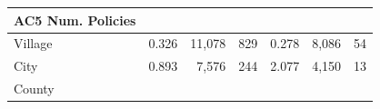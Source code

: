 \documentclass[]{book}
\theoremstyle{definition}
\theoremstyle{definition}
\theoremstyle{definition}
\theoremstyle{remark}
\begin{document}
\begin{longtable}[]{@{}lrrrrrr@{}}
\begin{minipage}[b]{0.11\columnwidth}
AC5 Num. Policies\strut
\end{minipage}\tabularnewline
\midrule
\endhead
\begin{minipage}[t]{0.10\columnwidth}\raggedright\strut
Village\strut
\end{minipage} & \begin{minipage}[t]{0.12\columnwidth}\raggedleft\strut
0.326\strut
\end{minipage} & \begin{minipage}[t]{0.11\columnwidth}\raggedleft\strut
11,078\strut
\end{minipage} & \begin{minipage}[t]{0.11\columnwidth}\raggedleft\strut
829\strut
\end{minipage} & \begin{minipage}[t]{0.12\columnwidth}\raggedleft\strut
0.278\strut
\end{minipage} & \begin{minipage}[t]{0.11\columnwidth}\raggedleft\strut
8,086\strut
\end{minipage} & \begin{minipage}[t]{0.11\columnwidth}\raggedleft\strut
54\strut
\end{minipage}\tabularnewline
\begin{minipage}[t]{0.10\columnwidth}\raggedright\strut
City\strut
\end{minipage} & \begin{minipage}[t]{0.12\columnwidth}\raggedleft\strut
0.893\strut
\end{minipage} & \begin{minipage}[t]{0.11\columnwidth}\raggedleft\strut
7,576\strut
\end{minipage} & \begin{minipage}[t]{0.11\columnwidth}\raggedleft\strut
244\strut
\end{minipage} & \begin{minipage}[t]{0.12\columnwidth}\raggedleft\strut
2.077\strut
\end{minipage} & \begin{minipage}[t]{0.11\columnwidth}\raggedleft\strut
4,150\strut
\end{minipage} & \begin{minipage}[t]{0.11\columnwidth}\raggedleft\strut
13\strut
\end{minipage}\tabularnewline
\begin{minipage}[t]{0.10\columnwidth}\raggedright\strut
County\strut
\end{minipage} & \begin{minipage}[t]{0.12\columnwidth}\raggedleft\strut

\end{minipage}
\end{longtable}
\end{document}
